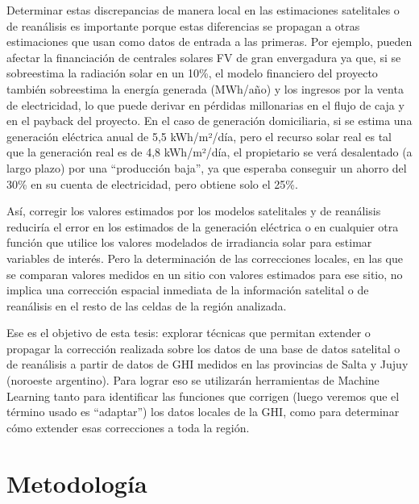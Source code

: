\documentclass[letterpaper,12pt, twoside]{report}
\providecommand{\DIFdeltex}[1]{{\protect\color{red} \scriptsize #1}} %
\providecommand{\DIFdel}[1]{\texorpdfstring{\DIFdeltex{#1}}{}} %
\begin{document}
\DIFdel{Determinar estas discrepancias de manera local en las estimaciones satelitales o de reanálisis es importante porque estas diferencias se propagan a otras estimaciones que usan como datos de entrada a las primeras. Por ejemplo, pueden afectar la financiación de centrales solares FV de gran envergadura ya que, si se sobreestima la radiación solar en un 10\%, el modelo financiero del proyecto también sobreestima la energía generada (MWh/año) y los ingresos por la venta de electricidad, lo que puede derivar en pérdidas millonarias en el flujo de caja y en el payback del proyecto. En el caso de generación domiciliaria, si se estima una generación eléctrica anual de 5,5 kWh/m²/día, pero el recurso solar real es tal que la generación real es de 4,8 kWh/m²/día, el propietario se verá desalentado (a largo plazo) por una “producción baja”, ya que esperaba conseguir un ahorro del 30\% en su cuenta de electricidad, pero obtiene solo el 25\%.
}%

\DIFdel{Así, corregir los valores estimados por los modelos satelitales y de reanálisis reduciría el error en los estimados de la generación eléctrica o en cualquier otra función que utilice los valores modelados de irradiancia solar para estimar variables de interés. Pero la determinación de las correcciones locales, en las que se comparan valores medidos en un sitio con valores estimados para ese sitio, no implica una corrección espacial inmediata de la información satelital o de reanálisis en el resto de las celdas de la región analizada.
}%

\DIFdel{Ese es el objetivo de esta tesis: explorar técnicas que permitan extender o propagar la corrección realizada sobre los datos de una base de datos satelital o de reanálisis a partir de datos de GHI medidos en las provincias de Salta y Jujuy (noroeste argentino). Para lograr eso se utilizarán herramientas de Machine Learning tanto para identificar las funciones que corrigen (luego veremos que el término usado es “adaptar”) los datos locales de la GHI, como para determinar cómo extender esas correcciones a toda la región.
}%

\section{\DIFdel{Metodología}}
\addtocounter{section}{-1}%
\end{document}
